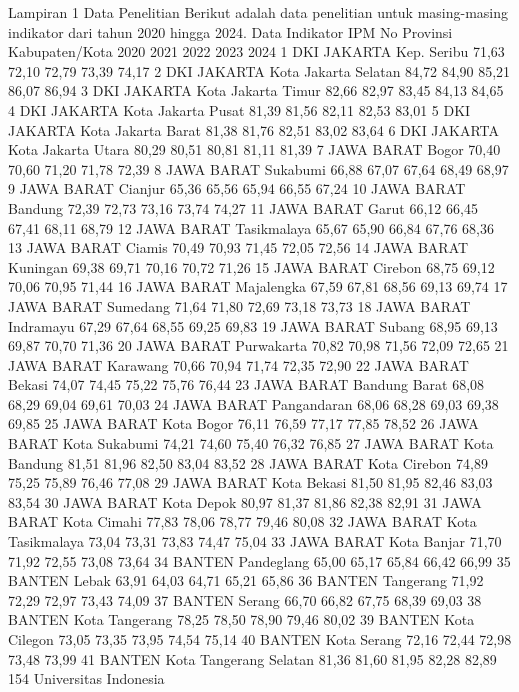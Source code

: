 Lampiran 1 Data Penelitian
Berikut adalah data penelitian untuk masing-masing indikator dari tahun 2020 hingga
2024.
Data Indikator IPM
No Provinsi Kabupaten/Kota 2020 2021 2022 2023 2024
1 DKI JAKARTA Kep. Seribu 71,63 72,10 72,79 73,39 74,17
2 DKI JAKARTA Kota Jakarta Selatan 84,72 84,90 85,21 86,07 86,94
3 DKI JAKARTA Kota Jakarta Timur 82,66 82,97 83,45 84,13 84,65
4 DKI JAKARTA Kota Jakarta Pusat 81,39 81,56 82,11 82,53 83,01
5 DKI JAKARTA Kota Jakarta Barat 81,38 81,76 82,51 83,02 83,64
6 DKI JAKARTA Kota Jakarta Utara 80,29 80,51 80,81 81,11 81,39
7 JAWA BARAT Bogor 70,40 70,60 71,20 71,78 72,39
8 JAWA BARAT Sukabumi 66,88 67,07 67,64 68,49 68,97
9 JAWA BARAT Cianjur 65,36 65,56 65,94 66,55 67,24
10 JAWA BARAT Bandung 72,39 72,73 73,16 73,74 74,27
11 JAWA BARAT Garut 66,12 66,45 67,41 68,11 68,79
12 JAWA BARAT Tasikmalaya 65,67 65,90 66,84 67,76 68,36
13 JAWA BARAT Ciamis 70,49 70,93 71,45 72,05 72,56
14 JAWA BARAT Kuningan 69,38 69,71 70,16 70,72 71,26
15 JAWA BARAT Cirebon 68,75 69,12 70,06 70,95 71,44
16 JAWA BARAT Majalengka 67,59 67,81 68,56 69,13 69,74
17 JAWA BARAT Sumedang 71,64 71,80 72,69 73,18 73,73
18 JAWA BARAT Indramayu 67,29 67,64 68,55 69,25 69,83
19 JAWA BARAT Subang 68,95 69,13 69,87 70,70 71,36
20 JAWA BARAT Purwakarta 70,82 70,98 71,56 72,09 72,65
21 JAWA BARAT Karawang 70,66 70,94 71,74 72,35 72,90
22 JAWA BARAT Bekasi 74,07 74,45 75,22 75,76 76,44
23 JAWA BARAT Bandung Barat 68,08 68,29 69,04 69,61 70,03
24 JAWA BARAT Pangandaran 68,06 68,28 69,03 69,38 69,85
25 JAWA BARAT Kota Bogor 76,11 76,59 77,17 77,85 78,52
26 JAWA BARAT Kota Sukabumi 74,21 74,60 75,40 76,32 76,85
27 JAWA BARAT Kota Bandung 81,51 81,96 82,50 83,04 83,52
28 JAWA BARAT Kota Cirebon 74,89 75,25 75,89 76,46 77,08
29 JAWA BARAT Kota Bekasi 81,50 81,95 82,46 83,03 83,54
30 JAWA BARAT Kota Depok 80,97 81,37 81,86 82,38 82,91
31 JAWA BARAT Kota Cimahi 77,83 78,06 78,77 79,46 80,08
32 JAWA BARAT Kota Tasikmalaya 73,04 73,31 73,83 74,47 75,04
33 JAWA BARAT Kota Banjar 71,70 71,92 72,55 73,08 73,64
34 BANTEN Pandeglang 65,00 65,17 65,84 66,42 66,99
35 BANTEN Lebak 63,91 64,03 64,71 65,21 65,86
36 BANTEN Tangerang 71,92 72,29 72,97 73,43 74,09
37 BANTEN Serang 66,70 66,82 67,75 68,39 69,03
38 BANTEN Kota Tangerang 78,25 78,50 78,90 79,46 80,02
39 BANTEN Kota Cilegon 73,05 73,35 73,95 74,54 75,14
40 BANTEN Kota Serang 72,16 72,44 72,98 73,48 73,99
41 BANTEN Kota Tangerang Selatan 81,36 81,60 81,95 82,28 82,89
154 Universitas Indonesia

